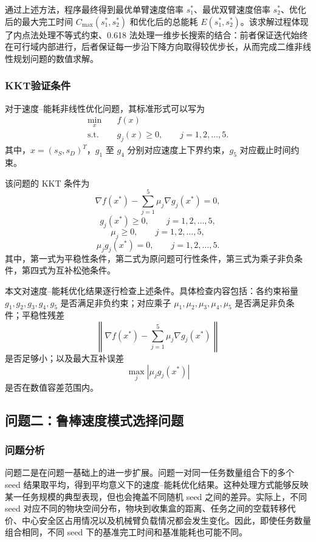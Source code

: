 通过上述方法，程序最终得到最优单臂速度倍率 $s_1^{*}$、最优双臂速度倍率 $s_2^{*}$、优化后的最大完工时间 $C_{\max}(s_1^{*},s_2^{*})$ 和优化后的总能耗 $E(s_1^{*},s_2^{*})$。该求解过程体现了内点法处理不等式约束、0.618 法处理一维步长搜索的结合：前者保证迭代始终在可行域内部进行，后者保证每一步沿下降方向取得较优步长，从而完成二维非线性规划问题的数值求解。


\subsubsection{KKT验证条件}

对于速度--能耗非线性优化问题，其标准形式可以写为
\[
\begin{aligned}
    \min_x\quad & f(x)\\
    \text{s.t.}\quad & g_j(x)\geq 0,\qquad j=1,2,\ldots,5.
\end{aligned}
\]
其中，$x=(s_S,s_D)^T$，$g_1$ 至 $g_4$ 分别对应速度上下界约束，$g_5$ 对应截止时间约束。

该问题的 KKT 条件为
\[
\nabla f(x^*)-\sum_{j=1}^{5}\mu_j \nabla g_j(x^*)=0,
\]
\[
g_j(x^*)\geq 0,\qquad j=1,2,\ldots,5,
\]
\[
\mu_j\geq 0,\qquad j=1,2,\ldots,5,
\]
\[
\mu_j g_j(x^*)=0,\qquad j=1,2,\ldots,5.
\]
其中，第一式为平稳性条件，第二式为原问题可行性条件，第三式为乘子非负条件，第四式为互补松弛条件。

本文对速度--能耗优化结果逐行检查上述条件。具体检查内容包括：各约束裕量 $g_1,g_2,g_3,g_4,g_5$ 是否满足非负约束；对应乘子 $\mu_1,\mu_2,\mu_3,\mu_4,\mu_5$ 是否满足非负条件；平稳性残差
\[
\left\|
\nabla f(x^*)-\sum_{j=1}^{5}\mu_j\nabla g_j(x^*)
\right\|
\]
是否足够小；以及最大互补误差
\[
\max_j \left|\mu_j g_j(x^*)\right|
\]
是否在数值容差范围内。


\subsection{问题二：鲁棒速度模式选择问题}

\subsubsection{问题分析}

问题二是在问题一基础上的进一步扩展。问题一对同一任务数量组合下的多个 seed 结果取平均，得到平均意义下的速度--能耗优化结果。这种处理方式能够反映某一任务规模的典型表现，但也会掩盖不同随机 seed 之间的差异。实际上，不同 seed 对应不同的物块空间分布，物块到收集盒的距离、任务之间的空载转移代价、中心安全区占用情况以及机械臂负载情况都会发生变化。因此，即使任务数量组合相同，不同 seed 下的基准完工时间和基准能耗也可能不同。

